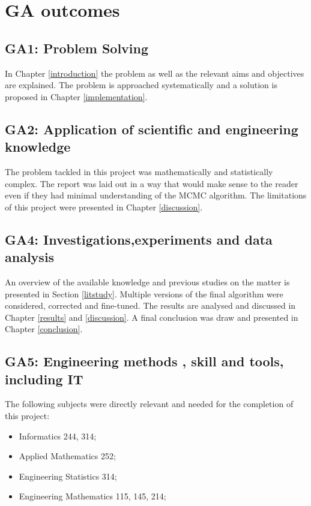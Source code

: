 \chapter{GA outcomes}
\section*{GA1: Problem Solving}
In Chapter \ref{introduction} the problem as well as the relevant aims and objectives are explained. The problem is approached systematically and a solution is proposed in Chapter \ref{implementation}.
\section*{GA2: Application of scientific and engineering knowledge}
The problem tackled in this project was mathematically and statistically complex. 
The report was laid out in a way that would make sense to the reader even if they had minimal understanding of the MCMC algorithm. 
The limitations of this project were presented in Chapter \ref{discussion}.
\section*{GA4: Investigations,experiments and data analysis}
An overview of the available knowledge and previous studies on the matter is presented in Section \ref{litstudy}. 
Multiple versions of the final algorithm were considered, corrected and fine-tuned. The results are analysed and discussed in Chapter \ref{results} and \ref{discussion}. A final conclusion was draw and presented in Chapter \ref{conclusion}.
\section*{GA5: Engineering methods , skill and tools, including IT}
The following subjects were directly relevant and needed for the completion of this project:\
\begin{itemize}
\item Informatics 244, 314;
\item Applied Mathematics 252;
\item Engineering Statistics 314;
\item Engineering Mathematics 115, 145, 214;
\end{itemize}

